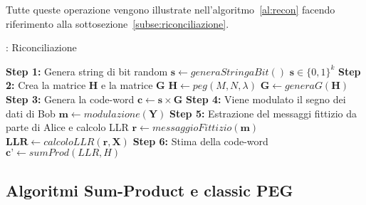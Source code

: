 Tutte queste operazione vengono illustrate nell'algoritmo~\ref{al:recon} facendo riferimento alla sottosezione~\ref{subse:riconciliazione}.

\begin{algorithm}[H]
\caption{: Riconciliazione}\label{al:recon}
\begin{algorithmic}[1]
\State \textbf{Step 1:} Genera string di bit random
	\State $\textbf{s} \leftarrow generaStringaBit()$	\Comment $\textbf{s} \in \{0,1\}^k$
\State \textbf{Step 2:} Crea la matrice $\textbf{H}$ e la matrice $\textbf{G}$
	\State $\textbf{H} \leftarrow peg(M,N, \lambda )$	 
	\State {}							
	\State $ \textbf{G} \leftarrow generaG(\textbf{H})$
\State \textbf{Step 3:} Genera la code-word
	\State $\textbf{c} \leftarrow \textbf{s} \times \textbf{G}$
\State \textbf{Step 4:} Viene modulato il segno dei dati di Bob
	\State $\textbf{m} \leftarrow modulazione(\textbf{Y})$
\State \textbf{Step 5:} Estrazione del messaggi fittizio da parte di Alice e calcolo LLR
	\State $\textbf{r} \leftarrow messaggioFittizio(\textbf{m})$
	\State $\textbf{LLR} \leftarrow calcoloLLR(\textbf{r}, \textbf{X})$
\State \textbf{Step 6:} Stima della code-word
	\State $\textbf{c'} \leftarrow sumProd(LLR, H)$
\end{algorithmic}
\end{algorithm}



\subsection{Algoritmi Sum-Product e classic PEG}\label{subse:algorithms}


